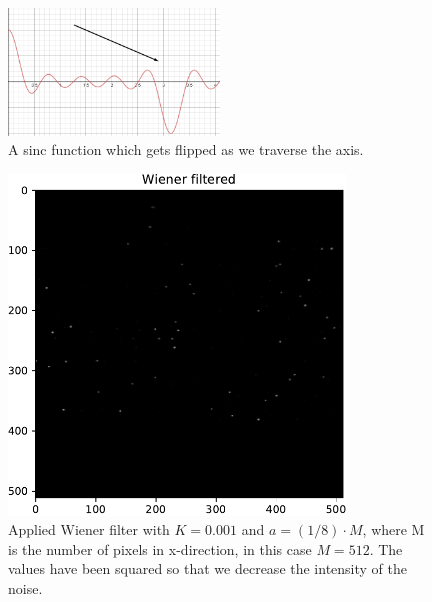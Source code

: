 {    \begin{figure}[H]
        {\centering
            \includegraphics[width=0.5\textwidth]{sincprob.png}
            \caption{A sinc function which gets flipped as we traverse the axis.}
            \label{sinccprob}
        \par}
        \end{figure}


\begin{figure}[H]
    {\centering
        \includegraphics[width=0.8\textwidth]{carttopol_trans_back2.pdf}
        \caption{Applied Wiener filter with $K = 0.001$ and $a = (1/8)\cdot M$, where M is the number of pixels in x-direction, in this case $M = 512$. The values have been squared so that we decrease the intensity of the noise.}
        \label{changingsystem2}
    \par}
    \end{figure}
    
}
